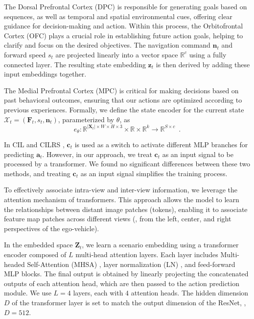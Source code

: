 The Dorsal Prefrontal Cortex (DPC) is responsible for generating goals based on sequences, as well as temporal and spatial environmental cues, offering clear guidance for decision-making and action.
Within this process, the Orbitofrontal Cortex (OFC) plays a crucial role in establishing future action goals, helping to clarify and focus on the desired objectives. 
The navigation command $\mathbf{n}_t$ and forward speed $s_t$ are projected linearly into a vector space $\mathbb{R}^{c}$ using a fully connected layer.
The resulting state embedding $\mathbf{z}_t$ is then derived by adding these input embeddings together.


The Medial Prefrontal Cortex (MPC) is critical for making decisions based on past behavioral outcomes, ensuring that our actions are optimized according to previous experiences.
Formally, we define the state encoder for the current state $\mathcal{X}_t=(\mathbf{F}_t, s_t, \mathbf{n}_t)$, parameterized by $\theta$, as
\begin{equation}\label{eq:encoder}
	e_{\theta}: \mathbb{R}^{|\mathbf{X}_{t}|\times W\times H\times3}\times\mathbb{R}\times \mathbb{R}^k \rightarrow \mathbb{R}^{S \times c} \enspace .
\end{equation}


In CIL \cite{Codevilla:2018} and CILRS \cite{Codevilla:2019}, $\mathbf{c}_{t}$ is used as a switch to activate different MLP branches for predicting $\mathbf{a}_{t}$. 
However, in our approach, we treat $\mathbf{c}_{t}$ as an input signal to be processed by a transformer. 
We found no significant differences between these two methods, and treating $\mathbf{c}_{t}$ as an input signal simplifies the training process.


To effectively associate intra-view and inter-view information, we leverage the attention mechanism of transformers\cite{Vaswani:2017}. 
This approach allows the model to learn the relationships between distant image patches (tokens), enabling it to associate feature map patches across different views ({\ie}, from the left, center, and right perspectives of the ego-vehicle). 


In the embedded space $\mathbf{Z}_{t}$, we learn a scenario embedding using a transformer encoder composed of $L$ multi-head attention layers. 
Each layer includes Multi-headed Self-Attention (MHSA) \cite{Vaswani:2017}, layer normalization (LN) \cite{Ba:2016}, and feed-forward MLP blocks.  
The final output is obtained by linearly projecting the concatenated outputs of each attention head, which are then passed to the action prediction module. 
We use $L=4$ layers, each with $4$ attention heads. 
The hidden dimension $D$ of the transformer layer is set to match the output dimension of the ResNet, {\ie}, $D=512$. 


